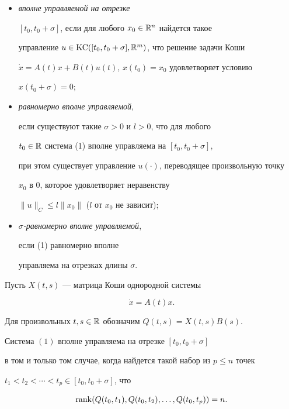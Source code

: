 \begin{itemize}


\item[1)] {\it вполне управляемой на отрезке}


$[t_0,t_0+\sigma]$, если для любого $x_{0}\in\Bbb R^n$ найдется такое


управление $u\in\operatorname{KC}([t_{0},t_{0}+\sigma],\Bbb R^m)$, что решение задачи Коши


$\Dot x=A(t)x+B(t)u(t)$, $x(t_{0})=x_0$ удовлетворяет условию


$x(t_{0}+\sigma)=0$;


\item[2)] {\it равномерно вполне управляемой},


если существуют такие $\sigma>0$ и $l>0$, что для любого


$t_{0}\in\Bbb R$ система (1) вполне управляема на $[t_0,t_0+\sigma]$,


при этом существует управление $u(\cdot)$, переводящее произвольную точку


$x_0$ в $0$, которое удовлетворяет неравенству


$\|u\|_{C}\le l\|x_{0}\|$ ($l$ от $x_0$ не зависит);


\item[3)] {\it $\sigma$-равномерно вполне управляемой},


если (1) равномерно вполне


управляема на отрезках длины $\sigma$.


\end{itemize}





Пусть $X(t,s)$ --- матрица Коши однородной системы


\begin{equation}


\Dot x=A(t)x.


\end{equation}


Для произвольных $t,s\in\Bbb R$ обозначим $Q(t,s)=X(t,s)B(s)$.





\begin{lem} Система $(1)$ вполне управляема на отрезке $[t_0,t_0+\sigma]$


в том и только том случае, когда найдется такой набор из $p\le n$ точек


$t_1<t_2<\dotsb<t_p\in [t_0,t_0+\sigma]$, что


\begin{equation}


\rank(Q(t_0,t_1),Q(t_0,t_2),\dotsc,Q(t_0,t_p))=n.


\end{equation}


\end{lem}





